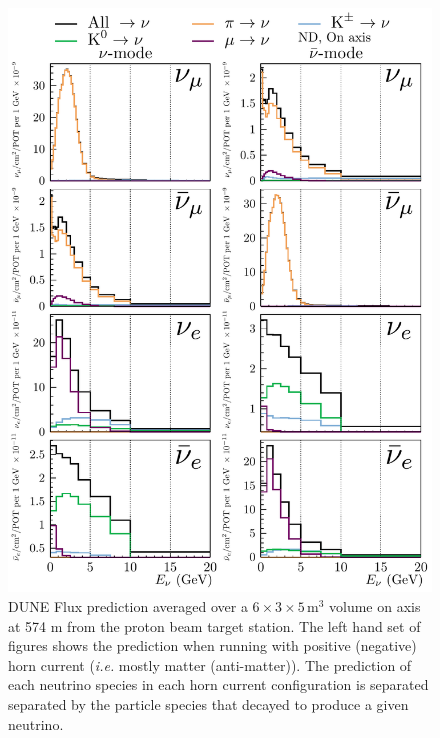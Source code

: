 \documentclass{article}
\begin{document}
\begin{figure}
  \includegraphics[width=\textwidth]{plots/fluxpredcompvar/ND_HadronParentFluxComponents_0m_offaxis}
  \caption{DUNE Flux prediction averaged over a $6\times 3\times 5\,\textrm{m}^{3}$ volume on axis at 574 m from the proton beam target station. The left hand set of figures shows the prediction when running with positive (negative) horn current (\textit{i.e.} mostly matter (anti-matter)). The prediction of each neutrino species in each horn current configuration is separated separated by the particle species that decayed to produce a given neutrino.}
  \label{fig:flux_predictions__on_axis}
\end{figure}
\end{document}
